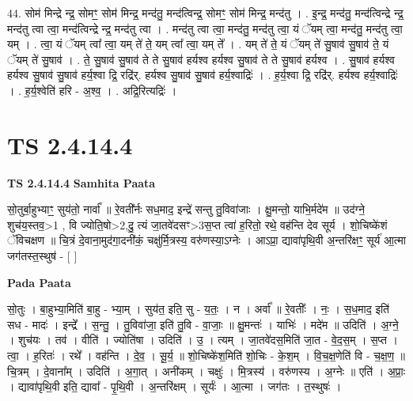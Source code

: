\documentclass[17pt]{extarticle}
\begin{document}
44. सोम॑ मिन्द्रे न्द्र॒ सोमꣳ॒॒ सोम॑ मिन्द्र॒ मन्द॑तु॒ मन्द॑त्विन्द्र॒ सोमꣳ॒॒ सोम॑ मिन्द्र॒ मन्द॑तु । . इ॒न्द्र॒ मन्द॑तु॒ मन्द॑त्विन्द्रे न्द्र॒ मन्द॑तु त्वा त्वा॒ मन्द॑त्विन्द्रे न्द्र॒ मन्द॑तु त्वा । . मन्द॑तु त्वा त्वा॒ मन्द॑तु॒ मन्द॑तु त्वा॒ यं ॅयम् त्वा॒ मन्द॑तु॒ मन्द॑तु त्वा॒ यम् । . त्वा॒ यं ॅयम् त्वा᳚ त्वा॒ यम् ते॑ ते॒ यम् त्वा᳚ त्वा॒ यम् ते᳚ । . यम् ते॑ ते॒ यं ॅयम् ते॑ सु॒षाव॑ सु॒षाव॑ ते॒ यं ॅयम् ते॑ सु॒षाव॑ । . ते॒ सु॒षाव॑ सु॒षाव॑ ते ते सु॒षाव॑ हर्यश्व हर्यश्व सु॒षाव॑ ते ते सु॒षाव॑ हर्यश्व । . सु॒षाव॑ हर्यश्व हर्यश्व सु॒षाव॑ सु॒षाव॑ हर्य॒श्वा द्रि॒ रद्रि॑र्. हर्यश्व सु॒षाव॑ सु॒षाव॑ हर्य॒श्वाद्रिः॑ । . ह॒र्य॒श्वा द्रि॒ रद्रि॑र्. हर्यश्व हर्य॒श्वाद्रिः॑ । . ह॒र्य॒श्वेति॑ हरि - अ॒श्व॒ । . अद्रि॒रित्यद्रिः॑ । \newline
\pagebreak
{}
\section*{ TS 2.4.14.4 }

\textbf{TS 2.4.14.4 } \newline
\textbf{Samhita Paata} \newline

सो॒तुर्बा॒हुभ्याꣳ॒॒ सुय॑तो॒ नार्वा᳚ ॥ रे॒वती᳚र्नः सध॒माद॒ इन्द्रे॑ सन्तु तु॒विवा॑जाः । क्षु॒मन्तो॒ याभि॒र्मदे॑म ॥ उद॑ग्ने॒ शुच॑य॒स्तव॒>1 , वि ज्योति॒षो>2,दु॒ त्यं जा॒तवे॑दसꣳ>3स॒प्त त्वा॑ ह॒रितो॒ रथे॒ वह॑न्ति देव सूर्य । शो॒चिष्के॑शं ॅविचक्षण ॥ चि॒त्रं दे॒वाना॒मुद॑गा॒दनी॑कं॒ चक्षु॑र्मि॒त्रस्य॒ वरु॑णस्या॒ऽग्नेः । आऽप्रा॒ द्यावा॑पृथि॒वी अ॒न्तरि॑क्षꣳ॒॒ सूर्य॑ आ॒त्मा जग॑तस्त॒स्थुष॑ - [  ] \newline

\textbf{Pada Paata} \newline

सो॒तुः । बा॒हुभ्या॒मिति॑ बा॒हु - भ्या॒म् । सुय॑त॒ इति॒ सु - य॒तः॒ । न । अर्वा᳚ ॥ रे॒वतीः᳚ । नः॒ । स॒ध॒माद॒ इति॑ सध - मादः॑ । इन्द्रे᳚ । स॒न्तु॒ । तु॒विवा॑जा॒ इति॑ तु॒वि - वा॒जाः॒ ॥ क्षु॒मन्तः॑ । याभिः॑ । मदे॑म ॥ उदिति॑ । अ॒ग्ने॒ । शुच॑यः । तव॑ । वीति॑ । ज्योति॑षा । उदिति॑ । उ॒ । त्यम् । जा॒तवे॑दस॒मिति॑ जा॒त - वे॒द॒स॒म् । स॒प्त । त्वा॒ । ह॒रितः॑ । रथे᳚ । वह॑न्ति । दे॒व॒ । सू॒र्य॒ ॥ शो॒चिष्के॑श॒मिति॑ शो॒चिः - के॒श॒म् । वि॒च॒क्ष॒णेति॑ वि -  च॒क्ष॒ण॒ ॥ चि॒त्रम् । दे॒वाना᳚म् । उदिति॑ । अ॒गा॒त् । अनी॑कम् । चक्षुः॑ । मि॒त्रस्य॑ । वरु॑णस्य ।   अ॒ग्नेः ॥ एति॑ । अ॒प्राः॒ । द्यावा॑पृथि॒वी इति॒ द्यावा᳚ - पृ॒थि॒वी । अ॒न्तरि॑क्षम् । सूर्यः॑ । आ॒त्मा ।   जग॑तः । त॒स्थुषः॑ ।  \newline
\end{document}
